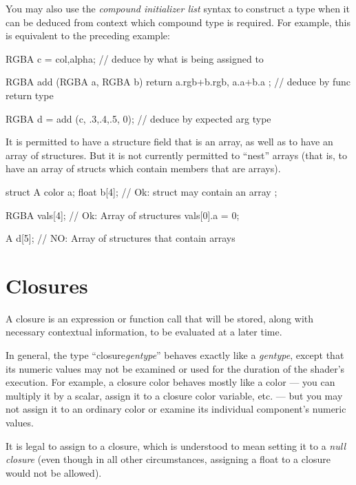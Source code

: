 \documentclass[11pt,letterpaper]{book}
\def\color{{\cf color}\xspace}
\def\closure{{\cf closure}\xspace}
\def\colorclosure{{\cf closure color}\xspace}
\begin{document}
\NEW %
You may also use the \emph{compound initializer list} syntax to construct a
type when it can be deduced from context which compound type is required.
For example, this is equivalent to the preceding example:

\begin{code}
    RGBA c = {col,alpha};    // deduce by what is being assigned to

    RGBA add (RGBA a, RGBA b)
    {
        return { a.rgb+b.rgb, a.a+b.a }; // deduce by func return type
    }

    RGBA d = add (c, {{.3,.4,.5}, 0}); // deduce by expected arg type
\end{code}

It is permitted to have a structure field that is an array, as well as to
have an array of structures.  But it is not currently permitted to ``nest''
arrays (that is, to have an array of structs which contain members that are
arrays).

\begin{code}
    struct A {
        color a;
        float b[4];       // Ok: struct may contain an array
    };

    RGBA vals[4];         // Ok: Array of structures
    vals[0].a = 0;

    A d[5];               // NO: Array of structures that contain arrays
\end{code}




\section{Closures}
\label{sec:types:closures}

A \closure is an expression or function call that will be stored, along
with necessary contextual information, to be evaluated at a later time.

In general, the type ``\closure \emph{gentype}'' behaves exactly like a
\emph{gentype}, except that its numeric values may not be examined or
used for the duration of the shader's execution.  For example, a
\colorclosure behaves mostly like a color --- you can multiply it by a
scalar, assign it to a \colorclosure variable, etc. --- but you may not
assign it to an ordinary \color or examine its individual component's
numeric values.

It is legal to assign {} to a closure, which is understood to mean
setting it to a \emph{null closure} (even though in all other
circumstances, assigning a {\cf float} to a \closure would not be
allowed).
\end{document}
